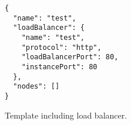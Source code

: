 \begin{figure}[tb]
  \begin{center}
    \begin{verbatim}
{
  "name": "test",
  "loadBalancer": {
    "name": "test",
    "protocol": "http",
    "loadBalancerPort": 80,
    "instancePort": 80
  }, 
  "nodes": []
}
    \end{verbatim}
  \end{center}
  \caption{Template including load balancer.}
  \label{list:loadbalancer}
\end{figure}


